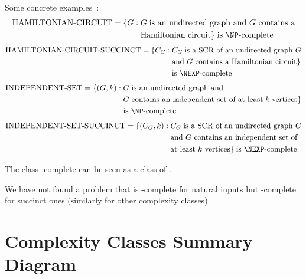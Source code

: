 \documentclass[a4paper]{report}
\theoremstyle{definition}
\begin{document}
Some concrete examples~\citep{yannakakis1986note}:
%
\begin{align*}
\text{HAMILTONIAN-CIRCUIT} = \{ G : & \;G \;\text{is an undirected graph and $G$ contains a}\\ &\;\text{Hamiltonian circuit}\} \;\text{is \NP-complete}
\end{align*}
%
\begin{align*}
\text{HAMILTONIAN-CIRCUIT-SUCCINCT} = \{ C_G : & \;C_G \;\text{is a SCR of an undirected graph $G$}\\ &\; \text{and $G$ contains a Hamiltonian circuit}\}\\ & \;\text{is \NEXP-complete}
\end{align*}
%
\begin{align*}
\text{INDEPENDENT-SET} = \{ (G, k) : &\; G \;\text{is an undirected graph and}\\ &\; G \;\text{contains an independent set of at least} \; k \; \text{vertices}\}\\ & \;\text{is \NP-complete}
\end{align*}
%
\begin{align*}
\text{INDEPENDENT-SET-SUCCINCT} = \{ (C_G, k) : &\; C_G \;\text{is a SCR of an undirected graph $G$}\\ & \;\text{and $G$ contains an independent set of}\\ &\;\text{at least $k$ vertices}\} \; \text{is \NEXP-complete}
\end{align*}

The class \NEXP-complete can be seen as a class of .

We have not found a problem that is \NP-complete for natural inputs but  \NEXP-complete for succinct ones (similarly for other complexity classes).

\section{Complexity Classes Summary Diagram}
\label{sec:summary}
\begin{center}
\scalebox{0.25}{}
\end{center}


\setlength{}
\printbibliography
{}

\newpage
\printindex
{}

%
%
\end{document}
